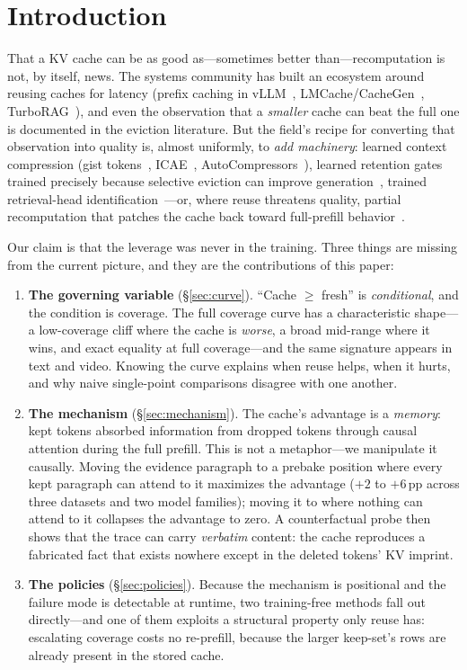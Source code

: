 \documentclass[11pt]{article}
\newcommand{\pp}{\,\mathrm{pp}}
\begin{document}
\section{Introduction}
\label{sec:intro}

That a KV cache can be as good as---sometimes better than---recomputation is not, by itself, news. The systems community has built an ecosystem around reusing caches for latency (prefix caching in vLLM~\cite{vllm}, LMCache/CacheGen~\cite{cachegen}, TurboRAG~\cite{turborag}), and even the observation that a \emph{smaller} cache can beat the full one is documented in the eviction literature. But the field's recipe for converting that observation into quality is, almost uniformly, to \emph{add machinery}: learned context compression (gist tokens~\cite{gist}, ICAE~\cite{icae}, AutoCompressors~\cite{autocompressors}), learned retention gates trained precisely because selective eviction can improve generation~\cite{maketokencount}, trained retrieval-head identification~\cite{duoattention}---or, where reuse threatens quality, partial recomputation that patches the cache back toward full-prefill behavior~\cite{cacheblend}.

Our claim is that the leverage was never in the training. Three things are missing from the current picture, and they are the contributions of this paper:

\begin{enumerate}[leftmargin=2em]
\item \textbf{The governing variable} (\S\ref{sec:curve}). ``Cache $\geq$ fresh'' is \emph{conditional}, and the condition is coverage. The full coverage curve has a characteristic shape---a low-coverage cliff where the cache is \emph{worse}, a broad mid-range where it wins, and exact equality at full coverage---and the same signature appears in text and video. Knowing the curve explains when reuse helps, when it hurts, and why naive single-point comparisons disagree with one another.
\item \textbf{The mechanism} (\S\ref{sec:mechanism}). The cache's advantage is a \emph{memory}: kept tokens absorbed information from dropped tokens through causal attention during the full prefill. This is not a metaphor---we manipulate it causally. Moving the evidence paragraph to a prebake position where every kept paragraph can attend to it maximizes the advantage ($+2$ to $+6\pp$ across three datasets and two model families); moving it to where nothing can attend to it collapses the advantage to zero. A counterfactual probe then shows that the trace can carry \emph{verbatim} content: the cache reproduces a fabricated fact that exists nowhere except in the deleted tokens' KV imprint.
\item \textbf{The policies} (\S\ref{sec:policies}). Because the mechanism is positional and the failure mode is detectable at runtime, two training-free methods fall out directly---and one of them exploits a structural property only reuse has: escalating coverage costs no re-prefill, because the larger keep-set's rows are already present in the stored cache.
\end{enumerate}
\end{document}
